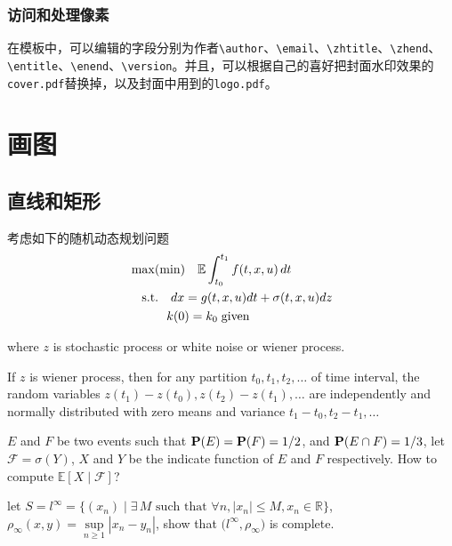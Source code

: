 \documentclass[color=green,mathpazo,titlestyle=hang]{elegantbook}
\begin{document}
\subsection{访问和处理像素}
在模板中，可以编辑的字段分别为作者\verb|\author|、\verb|\email|、\verb|\zhtitle|、\verb|\zhend|、\verb|\entitle|、\verb|\enend|、\verb|\version|。并且，可以根据自己的喜好把封面水印效果的\verb|cover.pdf|替换掉，以及封面中用到的\verb|logo.pdf|。

\chapter{画图}

\section{直线和矩形}
\lipsum[3]
考虑如下的随机动态规划问题
\begin{align*}
&\max(\min)\quad \mathbb{E}\int_{t_0}^{t_1}f(t,x,u)\,dt\\
&\quad\mbox{s.t.} \quad dx=g(t,x,u)dt+\sigma(t,x,u)dz\\
&\quad \hspace{2.em} k(0)=k_0\;\text{given}
\end{align*}

where $z$ is stochastic process or white noise or wiener process.

\begin{newdef}
If $z$ is wiener process, then for any partition $t_0,t_1,t_2,\ldots$ of time interval, the random variables $z(t_1)-z(t_0),z(t_2)-z(t_1),\ldots$ are independently and normally distributed with zero means and variance $t_1-t_0,t_2-t_1,\ldots$
\end{newdef}

\lipsum[5]

\begin{example}
$E$ and $F$ be two events such that $\mathbf{P}(E)=\mathbf{P}(F)=1/2$, and $\mathbf{P}(E\cap F)=1/3$, let $\mathscr{F}=\sigma(Y)$,  $X$ and $Y$ be the indicate function of $E$ and $F$ respectively. How to compute $\mathbb{E}[ X\mid \mathscr{F} ]$?
\end{example}
\lipsum[4]
\begin{exercise}
let $S=l^\infty=\big\{(x_n)\mid \exists\, M \text{ such that } \forall n, |x_n|\leq M,x_n\in \mathbb{R}\big\}$, $\rho_{\infty}(x,y)=\sup\limits_{n\geq 1}|x_n-y_n|$, show that $\big(l^\infty,\rho_{\infty}\big)$ is complete.
\end{exercise}
\end{document}
